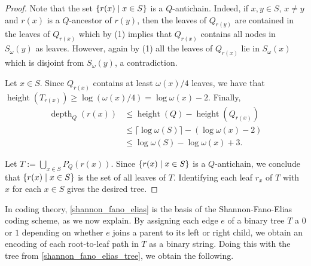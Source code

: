 \documentclass{patmorin}
\renewcommand{\le}{\leqslant}
\renewcommand{\geq}{\geqslant}
\DeclareMathOperator{\height}{height}
\DeclareMathOperator{\depth}{depth}
\DeclarePairedDelimiter{\set}{\{}{\}}
\begin{document}
\begin{proof}
     Note that the set $\set{r(x) \mid x\in S}$ is a $Q$-antichain. 
     Indeed, if $x,y\in S$, $x\neq y$ and $r(x)$ is a $Q$-ancestor of  $r(y)$, then the leaves of $Q_{r(y)}$ are contained in the leaves of $Q_{r(x)}$ which by (1) implies that $Q_{r(x)}$ contains all nodes in $S_{\omega}(y)$ as leaves. 
     However, again by (1) all the leaves of $Q_{r(x)}$ lie in $S_{\omega}(x)$ which is disjoint from $S_{\omega}(y)$, a contradiction.

    Let $x\in S$. Since $Q_{r(x)}$ contains at least $\omega(x)/4$ leaves, we have that 
$\height(T_{r(x)}) \geq \log(\omega(x)/4) = \log\omega(x) - 2$. 
Finally, 
     \begin{align*}
     \depth_Q(r(x))
     &\le \height(Q)-\height(Q_{r(x)})\\
     &\le \lceil\log\omega(S)\rceil - (\log\omega(x) - 2)\\
     &\le \log\omega(S) - \log\omega(x) +3.
     \end{align*}

    Let $T:=\bigcup_{x\in S} P_Q(r(x))$. 
    Since $\set{r(x) \mid x\in S}$ is a $Q$-antichain, 
    we conclude that $\set{r(x)\mid x\in S}$ is the set of all leaves of $T$. 
    Identifying each leaf $r_x$ of $T$ with $x$ for each $x\in S$ gives the desired tree.
   \end{proof}




  In coding theory, \cref{shannon_fano_elias} is the basis of the Shannon-Fano-Elias coding scheme, as we now explain.  By assigning each edge $e$ of a binary tree $T$ a $0$ or $1$ depending on whether $e$ joins a parent to its left or right child, we obtain an encoding of each root-to-leaf path in $T$ as a binary string. Doing this with the tree from \cref{shannon_fano_elias_tree}, we obtain the following. 
\end{document}
